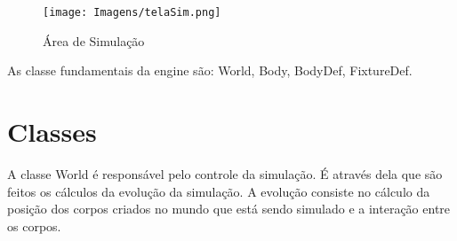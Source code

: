 \begin{figure}[!htb]
	\caption{Área de Simulação}
	\centering
	\texttt{[image: Imagens/telaSim.png]}
	
	\label{res_figura3}
\end{figure}

As classe fundamentais da engine são: World, Body, BodyDef, FixtureDef.

\section{Classes}

A classe World é responsável pelo controle da simulação. É através dela que são feitos os cálculos da evolução da simulação. A evolução consiste no cálculo da posição dos corpos criados no mundo que está sendo simulado e a interação entre os corpos.
